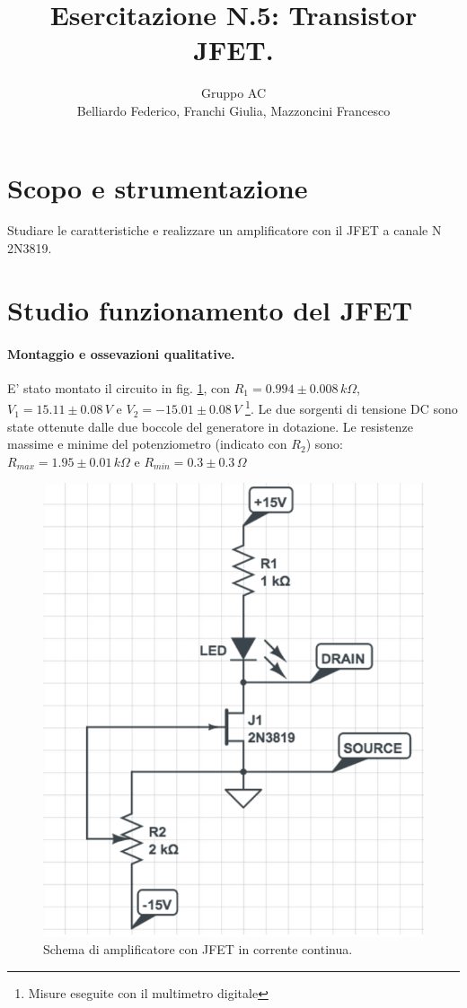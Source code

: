 \documentclass[10pt,a4paper]{article}
\author{Gruppo AC \\ Belliardo Federico, Franchi Giulia, Mazzoncini Francesco}
\title{Esercitazione N.5: Transistor JFET.}
\begin{document}
\maketitle

\section{Scopo e strumentazione}
Studiare le caratteristiche e realizzare un amplificatore con il JFET a canale N 2N3819.

\section{Studio funzionamento del JFET}
\paragraph{Montaggio e ossevazioni qualitative.}
E' stato montato il circuito in fig. \ref{circuito1}, con  $R_1 = 0.994\pm0.008 \, k\Omega$, $V_1 = 15.11\pm0.08 \, V$ e $V_2 = -15.01 \pm 0.08 \, V$ \footnote{Misure eseguite con il multimetro digitale}. Le due sorgenti di tensione DC sono state ottenute dalle due boccole del generatore in dotazione. Le resistenze massime e minime del potenziometro (indicato con $R_2$) sono:  $R_{max} = 1.95 \pm 0.01 \, k\Omega$ e $R_{min} = 0.3 \pm 0.3 \, \Omega$

\begin{figure}
\centering
\includegraphics[scale=0.3]{circuito1.png}
\caption{Schema di amplificatore con JFET in corrente continua.\label{circuito1}}
\end{figure}
\end{document}
